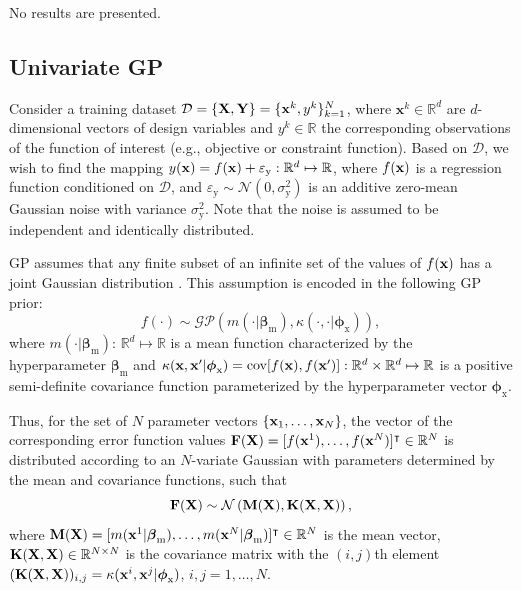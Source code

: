 \documentclass[iicol,sn-basic]{sn-jnl}%
\newcommand{\edit}[1]{\textcolor{red}{#1}} %
\begin{document}
No results are presented.
\begin{appendices}
	
\section{Univariate GP}\label{AppA}
\setcounter{equation}{0} %
\renewcommand{\theequation}{A.\arabic{equation}} %

Consider a training dataset $\mathcal{D}=\left\{ {\bf X},{\bf Y}\right\}=\{{\bf x}^k,y^k\}_{k=1}^N$, where $\textbf{x}^k\in\mathbb{R}^d$ are $d$-dimensional vectors of design variables and $y^k\in\mathbb{R}$ the corresponding observations of the function of interest (e.g., objective or constraint function).
Based on $\mathcal{D}$, we wish to find the mapping $y({\bf x})=f({\bf x}) + \varepsilon_\text{y}: \mathbb{R}^d \mapsto \mathbb{R}$, where $f({\bf x})$ is a regression function conditioned on $\mathcal{D}$, and $\varepsilon_\text{y} \sim \mathcal{N}(0,\sigma^2_\text{y})$ is an additive zero-mean Gaussian noise with variance $\sigma^2_\text{y}$.
Note that the noise is assumed to be independent and identically distributed.

GP assumes that any finite subset of an infinite set of the values of $f({\bf x})$ has a joint Gaussian distribution \citep{Rasmussen2006}.
This assumption is encoded in the following GP prior:
\begin{equation}\label{EqA1}
	f(\cdot) \sim \mathcal{GP} \left(m(\cdot|\boldsymbol \beta_\text{m}),\kappa(\cdot,\cdot|\boldsymbol \phi_{\text{x}})\right),
\end{equation}
where  $m(\cdot|\boldsymbol \beta_{\text{m}})$: $\mathbb{R}^d \mapsto \mathbb{R}$ is a mean function characterized by the hyperparameter $\boldsymbol \beta_{\text{m}}$ and $\kappa({\bf x},{\bf x}'|\boldsymbol \phi_{\text{x}}) = \text{cov}[f({\bf x}),f({\bf x}')]: \mathbb{R}^d \times \mathbb{R}^d \mapsto \mathbb{R} $ is %
{a positive semi-definite} covariance function parameterized by the hyperparameter vector $\boldsymbol \phi_{\text{x}}$.

Thus, for the set of $N$ parameter vectors $\{{\bf x}_1,\dots,\textbf{x}_N \}$, the vector of the corresponding error function values ${\bf F}({\bf X})=[f({\bf x}^1),\dots,f({\bf x}^N)]^\intercal \in \mathbb{R}^N$ is distributed according to %
{an $N$-variate Gaussian with parameters determined by the mean
and covariance functions, such that}
\begin{equation}\label{EqA2}
	{\bf F}({\bf X}) \sim \mathcal{N} \left({\bf M}({\bf X}),{\bf K}({\bf X},{\bf X})\right),
\end{equation}
where ${\bf M}({\bf X})=[m({\bf x}^1|\boldsymbol \beta_{\text{m}}),\dots,m({\bf x}^N|\boldsymbol \beta_{\text{m}})]^\intercal \in \mathbb{R}^N$ is the mean vector, ${\bf K}({\bf X},{\bf X}) \in \mathbb{R}^{N \times N}$ is the covariance matrix with the $(i,j)$th element $({\bf K}({\bf X},{\bf X}))_{i,j} = \kappa({\bf x}^i,{\bf x}^j|\boldsymbol \phi_{\text{x}})$, $i,j=1,\dots,N$.


\end{appendices}
\end{document}
